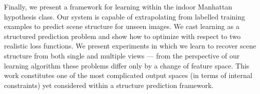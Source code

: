 Finally, we present a framework for learning within the indoor
Manhattan hypothesis class. Our system is capable of extrapolating
from labelled training examples to predict scene structure for
unseen images. We cast learning as a structured prediction
problem and show how to optimize with respect to two realistic loss
functions. We present experiments in which we learn to recover scene
structure from both single and multiple views --- from the perspective of
our learning algorithm these problems differ only by a change of
feature space. This work constitutes one of the most complicated
output spaces (in terms of internal constraints) yet considered within
a structure prediction framework.
